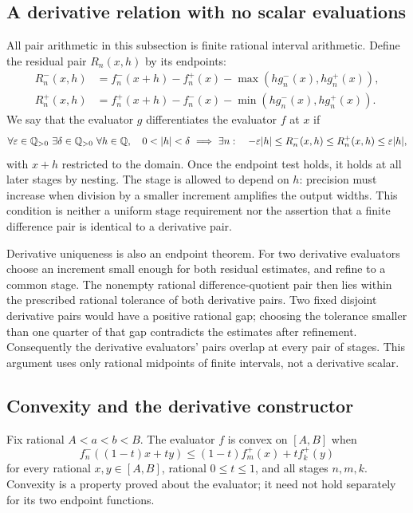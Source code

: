 \subsection{A derivative relation with no scalar evaluations}
All pair arithmetic in this subsection is finite rational interval
arithmetic.  Define the residual pair $R_n(x,h)$ by its endpoints:
\begin{align*}
 R_n^-(x,h)&=f_n^-(x+h)-f_n^+(x)
                   -\max(hg_n^-(x),hg_n^+(x)),\\
 R_n^+(x,h)&=f_n^+(x+h)-f_n^-(x)
                   -\min(hg_n^-(x),hg_n^+(x)).
\end{align*}
We say that the evaluator $g$ differentiates the evaluator $f$ at $x$ if
\[
 \forall\varepsilon\in\Q_{>0}\ \exists\delta\in\Q_{>0}\ 
 \forall h\in\Q,\quad
 0<|h|<\delta\ \Longrightarrow\ 
 \exists n:\quad
 -\varepsilon|h|\le R_n^-(x,h)\le R_n^+(x,h)\le\varepsilon|h|,
\]
with $x+h$ restricted to the domain.  Once the endpoint test holds, it
holds at all later stages by nesting.  The stage is allowed to depend
on $h$: precision must increase when division by a smaller increment
amplifies the output widths.  This condition is neither a uniform
stage requirement nor the assertion that a finite difference pair is
identical to a derivative pair.

Derivative uniqueness is also an endpoint theorem.  For two derivative
evaluators choose an increment small enough for both residual estimates,
and refine to a common stage.  The nonempty rational difference-quotient
pair then lies within the prescribed rational tolerance of both derivative
pairs.  Two fixed disjoint derivative pairs would have a positive rational
gap; choosing the tolerance smaller than one quarter of that gap contradicts
the estimates after refinement.  Consequently the derivative evaluators'
pairs overlap at every pair of stages.  This argument uses only rational
midpoints of finite intervals, not a derivative scalar.

\subsection{Convexity and the derivative constructor}
Fix rational $A<a<b<B$.  The evaluator $f$ is convex on $[A,B]$ when
\[
 f_n^-((1-t)x+ty)
       \le (1-t)f_m^+(x)+t f_k^+(y)
\]
for every rational $x,y\in[A,B]$, rational $0\le t\le1$, and
all stages $n,m,k$.  Convexity is a property proved about the evaluator;
it need not hold separately for its two endpoint functions.

